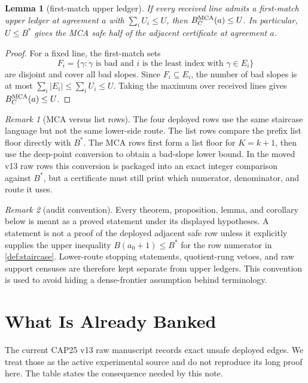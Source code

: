 \documentclass[a4paper,11pt]{amsart}
\newtheorem{lemma}[lemma]{Lemma}
\theoremstyle{remark}
\newtheorem{remark}[remark]{Remark}
\begin{document}
\begin{lemma}[first-match upper ledger]\label{lem:first-match-ledger}
If every received line admits a first-match upper ledger at agreement \(a\) with \(\sum_iU_i\le U\), then \(B_C^{\rm MCA}(a)\le U\).  In particular, \(U\le B^*\) gives the MCA safe half of the adjacent certificate at agreement \(a\).
\end{lemma}

\begin{proof}
For a fixed line, the first-match sets
\[
        F_i=\{\gamma:\gamma\text{ is bad and }i\text{ is the least index with }\gamma\in E_i\}
\]
are disjoint and cover all bad slopes.  Since \(F_i\subseteq E_i\), the number of bad slopes is at most \(\sum_i|E_i|\le\sum_iU_i\le U\).  Taking the maximum over received lines gives \(B_C^{\rm MCA}(a)\le U\).
\end{proof}

\begin{remark}[MCA versus list rows]\label{rem:mca-list-route}
The four deployed rows use the same staircase language but not the same lower-side route.  The list rows compare the prefix list floor directly with \(B^*\).  The MCA rows first form a list floor for \(K=k+1\), then use the deep-point conversion to obtain a bad-slope lower bound.  In the moved v13 raw rows this conversion is packaged into an exact integer comparison against \(B^*\), but a certificate must still print which numerator, denominator, and route it uses.
\end{remark}

\begin{remark}[audit convention]\label{rem:audit-convention}
Every theorem, proposition, lemma, and corollary below is meant as a proved statement under its displayed hypotheses.  A statement is not a proof of the deployed adjacent safe row unless it explicitly supplies the upper inequality \(B(a_0+1)\le B^*\) for the row numerator in \cref{def:staircase}.  Lower-route stopping statements, quotient-rung vetoes, and raw support censuses are therefore kept separate from upper ledgers.  This convention is used to avoid hiding a dense-frontier assumption behind terminology.
\end{remark}

\section{What Is Already Banked}

The current CAP25 v13 raw manuscript records exact unsafe deployed edges.  We treat those as the active experimental source and do not reproduce its long proof here.  The table states the consequence needed by this note.
\end{document}
